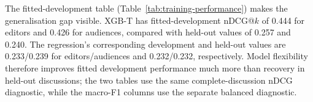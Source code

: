 The fitted-development table (Table~\ref{tab:training-performance}) makes the generalisation gap visible. XGB-T has fitted-development nDCG@$k$ of 0.444 for editors and 0.426 for audiences, compared with held-out values of 0.257 and 0.240. The regression's corresponding development and held-out values are 0.233/0.239 for editors/audiences and 0.232/0.232, respectively. Model flexibility therefore improves fitted development performance much more than recovery in held-out discussions; the two tables use the same complete-discussion nDCG diagnostic, while the macro-F1 columns use the separate balanced diagnostic.
